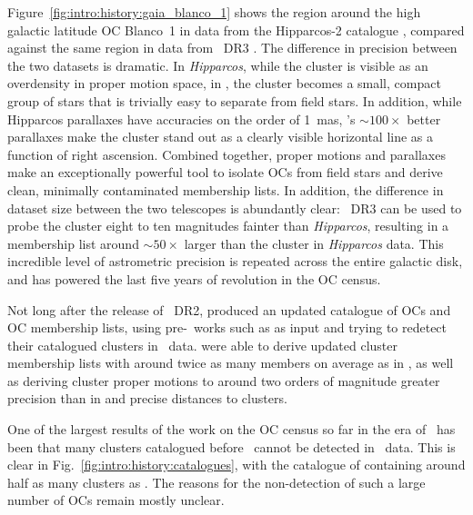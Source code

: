 Figure~\ref{fig:intro:history:gaia_blanco_1} shows the region around the high galactic latitude OC Blanco~1 in data from the Hipparcos-2 catalogue \citep{vanleeuwen_hipparcos_new_2007}, compared against the same region in data from \gaia\ DR3 \citep{gaia_collaboration_gaia_2022}. The difference in precision between the two datasets is dramatic. In \emph{Hipparcos}, while the cluster is visible as an overdensity in proper motion space, in \gaia, the cluster becomes a small, compact group of stars that is trivially easy to separate from field stars. In addition, while Hipparcos parallaxes have accuracies on the order of 1~mas, \gaia's $\sim100\times$ better parallaxes make the cluster stand out as a clearly visible horizontal line as a function of right ascension. Combined together, proper motions and parallaxes make an exceptionally powerful tool to isolate OCs from field stars and derive clean, minimally contaminated membership lists. In addition, the difference in dataset size between the two telescopes is abundantly clear: \gaia\ DR3 can be used to probe the cluster eight to ten magnitudes fainter than \emph{Hipparcos}, resulting in a membership list around $\sim50\times$ larger than the cluster in \emph{Hipparcos} data. This incredible level of astrometric precision is repeated across the entire galactic disk, and has powered the last five years of revolution in the OC census.


Not long after the release of \gaia\ DR2, \cite{cantat-gaudin_gaia_2018} produced an updated catalogue of OCs and OC membership lists, using pre-\gaia\ works such as \cite{kharchenko_global_2013} as input and trying to redetect their catalogued clusters in \gaia\ data. \cite{cantat-gaudin_gaia_2018} were able to derive updated cluster membership lists with around twice as many members on average as in \cite{kharchenko_global_2013}, as well as deriving cluster proper motions to around two orders of magnitude greater precision than in \cite{kharchenko_global_2013} and precise distances to clusters.

One of the largest results of the work on the OC census so far in the era of \gaia\ has been that many clusters catalogued before \gaia\ cannot be detected in \gaia\ data. This is clear in Fig.~\ref{fig:intro:history:catalogues}, with the catalogue of \cite{cantat-gaudin_gaia_2018} containing around half as many clusters as \cite{kharchenko_global_2013}. The reasons for the non-detection of such a large number of OCs remain mostly unclear. %

